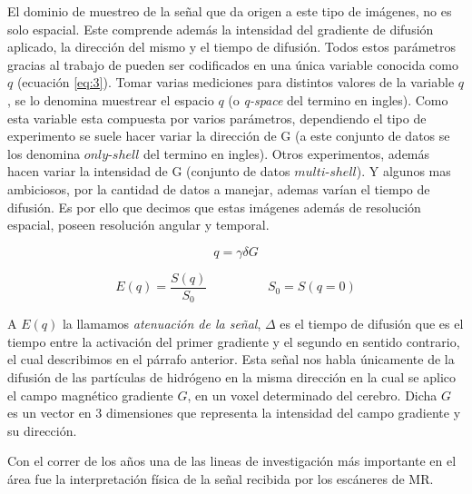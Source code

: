 El dominio de muestreo de la señal que da origen a este tipo de imágenes, no es solo 
espacial. Este comprende además la intensidad del gradiente de difusión aplicado, la dirección del 
mismo y el 
tiempo de difusión. Todos estos parámetros gracias al trabajo de \citet{CALLAGHAN1990177} pueden 
ser 
codificados en una única variable 
conocida como $q$ (ecuación \ref{eq:3}). Tomar varias mediciones para distintos valores de la 
variable $q$, se lo denomina 
muestrear el espacio $q$ (o \textit{q-space} del termino en ingles). Como esta variable esta 
compuesta por varios parámetros, dependiendo el tipo de experimento se 
suele hacer variar la dirección de G (a este conjunto de datos se los denomina $only$-$shell$ del 
termino en ingles). Otros experimentos,
además hacen variar la intensidad de G (conjunto de datos $multi$-$shell$). Y algunos mas 
ambiciosos, por la cantidad de datos a manejar, 
ademas varían el tiempo de difusión. Es por ello que decimos que estas imágenes además de 
resolución 
espacial, poseen resolución angular y temporal.


\begin{equation} 
\label{eq:3}
 q = \gamma \delta G
\end{equation}

\begin{equation} 
\label{eq:2}
E(q) = \frac{S(q)}{S_0} \hspace{2cm} S_0=S(q=0)
\end{equation}


A $E(q)$ la llamamos \textit{atenuaci\'on de la señal},  
$\Delta$ es el tiempo de difusión que es el tiempo entre la activación del primer gradiente y el 
segundo en 
sentido contrario, el cual describimos en el párrafo anterior. Esta señal nos 
habla \'unicamente de la difusi\'on de las part\'iculas de hidr\'ogeno en la misma 
direcci\'on en la cual se aplico el campo magn\'etico gradiente $G$, en un voxel determinado del 
cerebro. Dicha $G$ es un vector en 3 dimensiones que representa la intensidad 
del campo gradiente y su direcci\'on.


Con el correr de los años una de las lineas de investigación más 
importante en el \'area fue la interpretaci\'on f\'isica de la se\~nal recibida 
por los escáneres de MR.  



